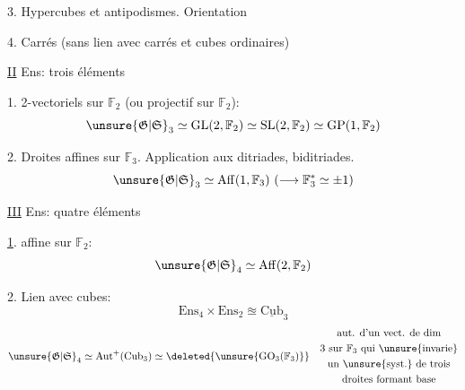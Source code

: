 3. Hypercubes et antipodismes. Orientation 

4. Carrés (sans lien avec carrés et cubes ordinaires)

\uline{II} Ens: trois éléments

1. 2-vectoriels sur $\mathbb F_2$ (ou   projectif sur $\mathbb F_2$):
\[
\unsure{\mathfrak G|\mathfrak S}_3\simeq\mathrm{GL}(2,\mathbb F_2)\simeq\mathrm{SL}(2,\mathbb F_2)\simeq\mathrm{GP}(1,\mathbb F_2)
\]

2. Droites affines sur $\mathbb F_3$. Application aux ditriades, biditriades.
\[
\unsure{\mathfrak G|\mathfrak S}_3\simeq\operatorname{Aff}(1,\mathbb F_3)\ (\longrightarrow\mathbb F_3^*\simeq\pm1)
\]



\uline{III} Ens: quatre éléments


\uline{1}.   affine sur $\mathbb F_2$:
\[
\unsure{\mathfrak G|\mathfrak S}_4\simeq\operatorname{Aff}(2,\mathbb F_2)
\]

2. Lien avec cubes:
\[
\mathrm{Ens}_4\times\mathrm{Ens}_2\approxeq\underline{\mathrm{Cub}}_3
\]
\[
\unsure{\mathfrak G|\mathfrak S}_4\simeq\operatorname{Aut}^+(\mathrm{Cub}_3)\simeq\deleted{\unsure{\mathrm{GO}_3(\mathbb F_3)}}\quad\begin{gathered}
\text{aut. d'un vect. de dim}\\
\text{3 sur }\mathbb F_3\text{ qui \unsure{invarie}}\\
\text{un \unsure{syst.} de trois}\\
\text{droites formant base}
\end{gathered}
\]

